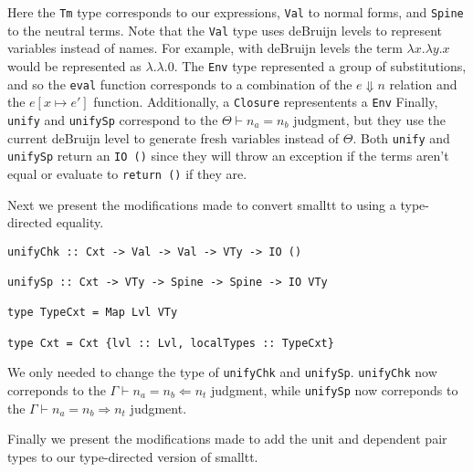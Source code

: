 \documentclass[sigplan,nonacm]{acmart}
\newcommand{\stxEqJ}[3]{#1 \vdash #2 = #3}
\newcommand{\chkEqJ}[4]{#1 \vdash #2 = #3 \Leftarrow #4}
\newcommand{\synEqJ}[4]{#1 \vdash #2 = #3 \Rightarrow #4}
\newcommand{\steps}[2]{#1 \Downarrow #2}
\newcommand{\subst}[3]{#1 [#2 \mapsto #3]}
\begin{document}
Here the \lstinline{Tm} type corresponds to our expressions, \lstinline{Val} to normal forms, and \lstinline{Spine} to the neutral terms.
Note that the \lstinline{Val} type uses deBruijn levels to represent variables instead of names.
For example, with deBruijn levels the term $\lambda x. \lambda y. x$ would be represented as $\lambda. \lambda. 0$.
The \lstinline{Env} type represented a group of substitutions, and so the \lstinline{eval} function corresponds to a combination of the $\steps{e}{n}$ relation and the $\subst{e}{x}{e'}$ function.
Additionally, a \lstinline{Closure} representents a \lstinline{Env}
Finally, \lstinline{unify} and \lstinline{unifySp} correspond to the $\stxEqJ{\Theta}{n_a}{n_b}$ judgment, but they use the current deBruijn level to generate fresh variables instead of $\Theta$.
Both \lstinline{unify} and \lstinline{unifySp} return an \lstinline{IO ()} since they will throw an exception if the terms aren't equal or evaluate to \lstinline{return ()} if they are.

\newpage

Next we present the modifications made to convert smalltt to using a type-directed equality.

\begin{lstlisting}
unifyChk :: Cxt -> Val -> Val -> VTy -> IO ()

unifySp :: Cxt -> VTy -> Spine -> Spine -> IO VTy

type TypeCxt = Map Lvl VTy

type Cxt = Cxt {lvl :: Lvl, localTypes :: TypeCxt}
\end{lstlisting}

We only needed to change the type of \lstinline{unifyChk} and \lstinline{unifySp}.
\lstinline{unifyChk} now correponds to the $\chkEqJ{\Gamma}{n_a}{n_b}{n_t}$ judgment, while \lstinline{unifySp} now correponds to the $\synEqJ{\Gamma}{n_a}{n_b}{n_t}$ judgment.

Finally we present the modifications made to add the unit and dependent pair types to our type-directed version of smalltt.

\end{document}
